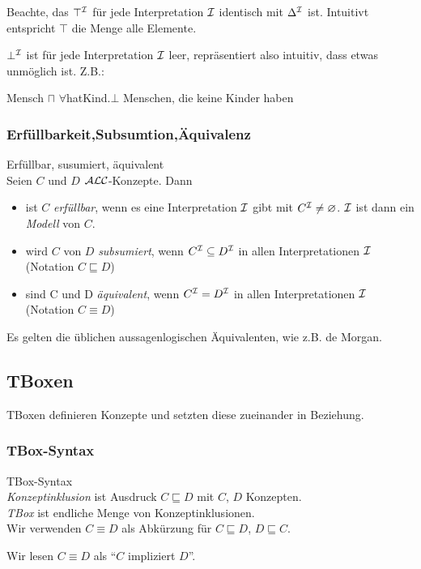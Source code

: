 Beachte, das $\top^{\mathcal{I}}$ für jede Interpretation $\mathcal{I}$ identisch mit $\Delta^{\mathcal{I}}$ ist. Intuitivt entspricht $\top$ die Menge alle Elemente. 

$\bot^{\mathcal{I}}$ ist für jede Interpretation $\mathcal{I}$ leer, repräsentiert also intuitiv, dass etwas unmöglich ist. Z.B.:

Mensch $\sqcap$ $\forall$hatKind.$\bot$
Menschen, die keine Kinder haben

{\subsubsection{Erfüllbarkeit,Subsumtion,Äquivalenz}\label{erfuxfcllbarkeit-subsumtion-uxe4quivalenz}}

\begin{definition}{Erfüllbar, susumiert, äquivalent} \\
Seien $C$ und $D$ $\mathcal{A}\mathcal{L}\mathcal{C}$-Konzepte. Dann

\begin{itemize}
\item
  ist $C$ \emph{erfüllbar}, wenn es eine Interpretation $\mathcal{I}$ gibt mit
  $C^{\mathcal{I}} \neq \varnothing$. $\mathcal{I}$ ist dann ein \emph{Modell} von
  $C$.
\item
  wird $C$ von $D$ \emph{subsumiert}, wenn $C^{\mathcal{I}} \subseteq D^{\mathcal{I}}$
  in allen Interpretationen $\mathcal{I}$ (Notation $C \sqsubseteq D$)
\item
  sind C und D \emph{äquivalent}, wenn $C^{\mathcal{I}} = D^{\mathcal{I}}$ in allen
  Interpretationen $\mathcal{I}$ (Notation $C \equiv D$)
\end{itemize}
\end{definition}

Es gelten die üblichen aussagenlogischen Äquivalenten, wie z.B. de
Morgan.

\subsection{TBoxen}\label{tboxen}

TBoxen definieren Konzepte und setzten diese zueinander in Beziehung.

\subsubsection{TBox-Syntax}\label{tboxsyntax}

\begin{definition}{TBox-Syntax} \\
\emph{Konzeptinklusion} ist Ausdruck $C \sqsubseteq D$ mit $C$, $D$ Konzepten. \\
\emph{TBox} ist endliche Menge von Konzeptinklusionen. \\
Wir verwenden $C \equiv D$ als Abkürzung für $C \sqsubseteq D$, $D \sqsubseteq C$. 

Wir lesen $C \equiv D$ als \enquote{$C$ impliziert $D$}.
\end{definition}

